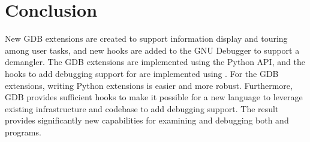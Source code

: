 \chapter{Conclusion}
New GDB extensions are created to support information display and touring among
\uCPPS user tasks, and new hooks are added to the GNU Debugger to support a
\CFAS demangler. The GDB extensions are implemented using the Python API, and
the hooks to add debugging support for \CFAS are implemented using \uCPPS. For
the GDB extensions, writing Python extensions is easier and more robust.
Furthermore, GDB provides sufficient hooks to make it possible for a new
language to leverage existing infrastructure and codebase to add debugging
support. The result provides significantly new capabilities for examining and
debugging both \uCPPS and \CFAS programs.
